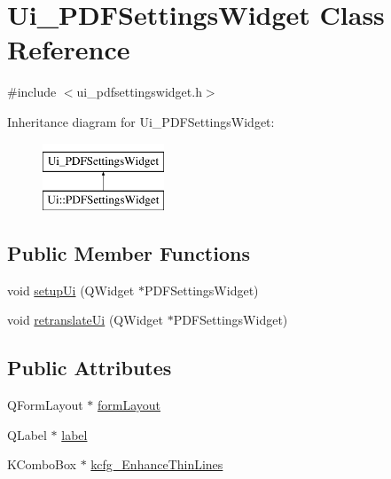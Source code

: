 \hypertarget{classUi__PDFSettingsWidget}{\section{Ui\+\_\+\+P\+D\+F\+Settings\+Widget Class Reference}
\label{classUi__PDFSettingsWidget}
}


{\ttfamily \#include $<$ui\+\_\+pdfsettingswidget.\+h$>$}

Inheritance diagram for Ui\+\_\+\+P\+D\+F\+Settings\+Widget\+:\begin{figure}[H]
\begin{center}
\leavevmode
\includegraphics[height=2.000000cm]{classUi__PDFSettingsWidget}
\end{center}
\end{figure}
\subsection*{Public Member Functions}
\begin{DoxyCompactItemize}
\item 
void \hyperlink{classUi__PDFSettingsWidget_a9df450caf334109eaa9a550f780451de}{setup\+Ui} (Q\+Widget $\ast$P\+D\+F\+Settings\+Widget)
\item 
void \hyperlink{classUi__PDFSettingsWidget_a6543867d868ad486b8f7b5b3fcadd189}{retranslate\+Ui} (Q\+Widget $\ast$P\+D\+F\+Settings\+Widget)
\end{DoxyCompactItemize}
\subsection*{Public Attributes}
\begin{DoxyCompactItemize}
\item 
Q\+Form\+Layout $\ast$ \hyperlink{classUi__PDFSettingsWidget_a9a27abeea2f52398c9fd23eab5c60bce}{form\+Layout}
\item 
Q\+Label $\ast$ \hyperlink{classUi__PDFSettingsWidget_a330418abe746e160353aba80de5c435c}{label}
\item 
K\+Combo\+Box $\ast$ \hyperlink{classUi__PDFSettingsWidget_ad49fd3583fc2d3fb249d46949fdd23d0}{kcfg\+\_\+\+Enhance\+Thin\+Lines}
\end{DoxyCompactItemize}


